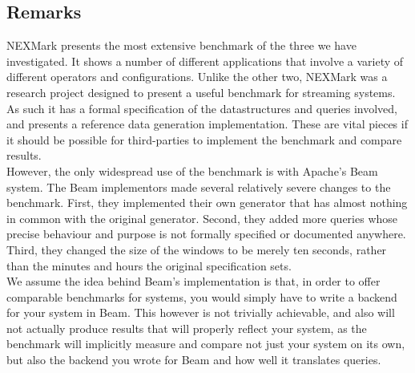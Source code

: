 \subsection{Remarks}\label{section:nexmark-remarks}
NEXMark presents the most extensive benchmark of the three we have investigated. It shows a number of different applications that involve a variety of different operators and configurations. Unlike the other two, NEXMark was a research project designed to present a useful benchmark for streaming systems. As such it has a formal specification of the datastructures and queries involved, and presents a reference data generation implementation. These are vital pieces if it should be possible for third-parties to implement the benchmark and compare results. \\

However, the only widespread use of the benchmark is with Apache's Beam system. The Beam implementors made several relatively severe changes to the benchmark. First, they implemented their own generator that has almost nothing in common with the original generator. Second, they added more queries whose precise behaviour and purpose is not formally specified or documented anywhere. Third, they changed the size of the windows to be merely ten seconds, rather than the minutes and hours the original specification sets. \\

We assume the idea behind Beam's implementation is that, in order to offer comparable benchmarks for systems, you would simply have to write a backend for your system in Beam. This however is not trivially achievable, and also will not actually produce results that will properly reflect your system, as the benchmark will implicitly measure and compare not just your system on its own, but also the backend you wrote for Beam and how well it translates queries. \\

